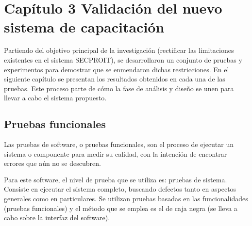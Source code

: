 \chapter*{Capítulo 3 \vspace{0.5cm} \break Validación del nuevo sistema de capacitación}
\setcounter{chapter}{3}
\setcounter{section}{0}

Partiendo del objetivo principal de la investigación (rectificar las limitaciones existentes en el sistema SECPROIT), se desarrollaron un conjunto de pruebas y experimentos para demostrar que se enmendaron dichas restricciones. En el siguiente capítulo se presentan los resultados obtenidos en cada una de las pruebas. Este proceso parte de cómo la fase de análisis y diseño se unen para llevar a cabo el sistema propuesto.

\section{Pruebas funcionales}
 Las pruebas de software, o pruebas funcionales, son el proceso de ejecutar un sistema o componente para medir su calidad, con la intención de encontrar errores que aún no se descubren. %

Para este software, el nivel de prueba que se utiliza es: pruebas de sistema. Consiste en ejecutar el sistema completo, buscando defectos tanto en aspectos generales como en particulares. Se utilizan pruebas basadas en las funcionalidades (pruebas funcionales) y el método que se emplea es el de caja negra (se lleva a cabo sobre la interfaz del software). %
